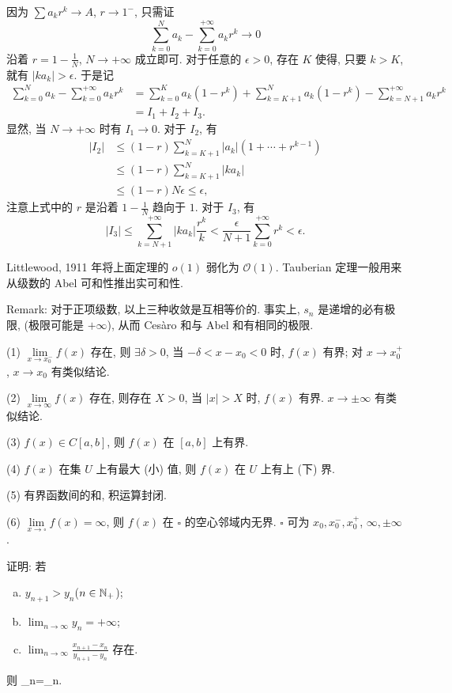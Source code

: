 \ba
因为 $\sum a_{k}r^{k}\to A$, $r\to1^{-}$, 只需证
\[
\sum_{k=0}^{N}a_{k}-\sum_{k=0}^{+\infty}a_{k}r^{k}\rightarrow0
\]
沿着 $r=1-\frac{1}{N}$, $N\to+\infty$ 成立即可. 对于任意的 $\epsilon>0$, 存在 $K$ 使得,
只要 $k>K$, 就有 $\left|ka_{k}\right|>\epsilon$. 于是记
\[
\begin{aligned}\sum_{k=0}^{N}a_{k}-\sum_{k=0}^{+\infty}a_{k}r^{k} & =\sum_{k=0}^{K}a_{k}\left(1-r^{k}\right)+\sum_{k=K+1}^{N}a_{k}\left(1-r^{k}\right)-\sum_{k=N+1}^{+\infty}a_{k}r^{k}\\
& =I_{1}+I_{2}+I_{3}.
\end{aligned}
\]
显然, 当 $N\to+\infty$ 时有 $I_{1}\to0$. 对于 $I_{2}$, 有
\[
\begin{aligned}\left|I_{2}\right| & \leq(1-r)\sum_{k=K+1}^{N}\left|a_{k}\right|\left(1+\cdots+r^{k-1}\right)\\
& \leq(1-r)\sum_{k=K+1}^{N}\left|ka_{k}\right|\\
& \leq(1-r)N\epsilon\leq\epsilon,
\end{aligned}
\]
注意上式中的 $r$ 是沿着 $1-\frac{1}{N}$ 趋向于 $1$. 对于 $I_{3}$, 有
\[
\left|I_{3}\right|\leq\sum_{k=N+1}^{+\infty}\left|ka_{k}\right|\frac{r^{k}}{k}<\frac{\epsilon}{N+1}\sum_{k=0}^{+\infty}r^{k}<\epsilon.
\]
\ea

Littlewood, 1911 年将上面定理的 $o(1)$ 弱化为 $\mathcal{O}(1)$. Tauberian 定理一般用来从级数的 Abel 可和性推出实可和性.

Remark: 对于正项级数, 以上三种收敛是互相等价的. 事实上, $s_{n}$ 是递增的必有极限, (极限可能是 $+\infty$),
从而 Ces\`{a}ro 和与 Abel 和有相同的极限.

(1) $\lim\limits_{x\to x_0^{-}}f(x)$ 存在, 则 $\exists\delta>0$, 当 $-\delta<x-x_0<0$ 时, $f(x)$ 有界; 对 $x\to x_0^+$, $x\to x_0$ 有类似结论.

(2) $\lim\limits_{x\to\infty}f(x)$ 存在, 则存在 $X>0$, 当 $|x|>X$ 时, $f(x)$ 有界. $x\to\pm\infty$ 有类似结论.

(3) $f(x)\in C[a,b]$, 则 $f(x)$ 在 $[a,b]$ 上有界.

(4) $f(x)$ 在集 $U$ 上有最大 (小) 值, 则 $f(x)$ 在 $U$ 上有上 (下) 界.

(5) 有界函数间的和, 积运算封闭.

(6) $\lim\limits_{x\to\square}f(x)=\infty$, 则 $f(x)$ 在 $\square$ 的空心邻域内无界. $\square$ 可为 $x_0, x_0^-, x_0^+$, $\infty, \pm\infty$.
\et

证明: 若
\begin{enumerate}[(a)]
 \item $y_{n+1}>y_n$($n\in\mathbb{N}_{+}$);
 \item $\lim_{n\to\infty}y_n=+\infty$;
 \item $\lim_{n\to\infty}\frac{x_{n+1}-x_n}{y_{n+1}-y_n}$ 存在.
\end{enumerate}
则
\bee
\lim_{n\to\infty}=\lim_{n\to\infty}.
\eee
\et

